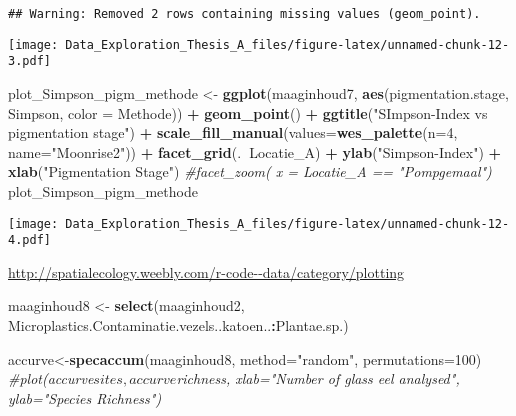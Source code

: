 \documentclass[]{article}
\newenvironment{Shaded}{\begin{snugshade}}{\end{snugshade}}
\newcommand{\KeywordTok}[1]{\textcolor[rgb]{0.13,0.29,0.53}{\textbf{#1}}}
\newcommand{\DataTypeTok}[1]{\textcolor[rgb]{0.13,0.29,0.53}{#1}}
\newcommand{\DecValTok}[1]{\textcolor[rgb]{0.00,0.00,0.81}{#1}}
\newcommand{\StringTok}[1]{\textcolor[rgb]{0.31,0.60,0.02}{#1}}
\newcommand{\CommentTok}[1]{\textcolor[rgb]{0.56,0.35,0.01}{\textit{#1}}}
\newcommand{\OperatorTok}[1]{\textcolor[rgb]{0.81,0.36,0.00}{\textbf{#1}}}
\newcommand{\NormalTok}[1]{#1}
\begin{document}
\begin{verbatim}
## Warning: Removed 2 rows containing missing values (geom_point).
\end{verbatim}

\texttt{[image: Data\_Exploration\_Thesis\_A\_files/figure-latex/unnamed-chunk-12-3.pdf]}

\begin{Shaded}
\begin{Highlighting}[]
\NormalTok{plot_Simpson_pigm_methode <-}\StringTok{ }\KeywordTok{ggplot}\NormalTok{(maaginhoud7, }\KeywordTok{aes}\NormalTok{(pigmentation.stage, Simpson, }\DataTypeTok{color =}\NormalTok{ Methode)) }\OperatorTok{+}
\StringTok{  }\KeywordTok{geom_point}\NormalTok{() }\OperatorTok{+}
\StringTok{  }\KeywordTok{ggtitle}\NormalTok{(}\StringTok{"SImpson-Index vs pigmentation stage"}\NormalTok{) }\OperatorTok{+}
\StringTok{  }\KeywordTok{scale_fill_manual}\NormalTok{(}\DataTypeTok{values=}\KeywordTok{wes_palette}\NormalTok{(}\DataTypeTok{n=}\DecValTok{4}\NormalTok{, }\DataTypeTok{name=}\StringTok{"Moonrise2"}\NormalTok{)) }\OperatorTok{+}\StringTok{ }
\StringTok{  }\KeywordTok{facet_grid}\NormalTok{(.}\OperatorTok{~}\NormalTok{Locatie_A) }\OperatorTok{+}
\StringTok{  }\KeywordTok{ylab}\NormalTok{(}\StringTok{"Simpson-Index"}\NormalTok{) }\OperatorTok{+}
\StringTok{  }\KeywordTok{xlab}\NormalTok{(}\StringTok{"Pigmentation Stage"}\NormalTok{)}
  \CommentTok{#facet_zoom( x = Locatie_A == "Pompgemaal")}
\NormalTok{plot_Simpson_pigm_methode}
\end{Highlighting}
\end{Shaded}

\texttt{[image: Data\_Exploration\_Thesis\_A\_files/figure-latex/unnamed-chunk-12-4.pdf]}

\url{http://spatialecology.weebly.com/r-code--data/category/plotting}

\begin{Shaded}
\begin{Highlighting}[]
\NormalTok{maaginhoud8 <-}\StringTok{ }\KeywordTok{select}\NormalTok{(maaginhoud2, Microplastics.Contaminatie.vezels..katoen..}\OperatorTok{:}\NormalTok{Plantae.sp.)}

\NormalTok{accurve<-}\KeywordTok{specaccum}\NormalTok{(maaginhoud8, }\DataTypeTok{method=}\StringTok{"random"}\NormalTok{, }\DataTypeTok{permutations=}\DecValTok{100}\NormalTok{)}
\CommentTok{#plot(accurve$sites, accurve$richness, xlab="Number of glass eel analysed", ylab="Species Richness")}
\end{Highlighting}
\end{Shaded}
\end{document}
